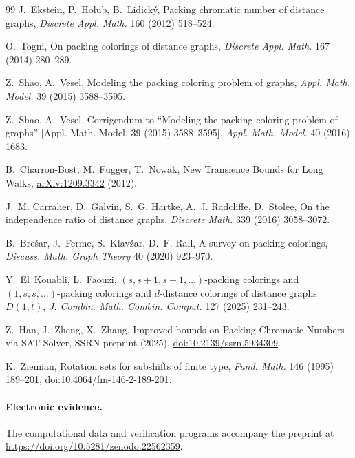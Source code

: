 \documentclass[11pt,reqno]{amsart}
\theoremstyle{plain}
\theoremstyle{plain}
\theoremstyle{plain}
\begin{document}
\begin{thebibliography}{99}
J.~Ekstein, P.~Holub, B.~Lidick\'y,
\newblock Packing chromatic number of distance graphs,
\newblock \emph{Discrete Appl. Math.} 160 (2012) 518--524.

O.~Togni,
\newblock On packing colorings of distance graphs,
\newblock \emph{Discrete Appl. Math.} 167 (2014) 280--289.

Z.~Shao, A.~Vesel,
\newblock Modeling the packing coloring problem of graphs,
\newblock \emph{Appl. Math. Model.} 39 (2015) 3588--3595.

Z.~Shao, A.~Vesel,
\newblock Corrigendum to ``Modeling the packing coloring problem of graphs''
  [Appl. Math. Model. 39 (2015) 3588--3595],
\newblock \emph{Appl. Math. Model.} 40 (2016) 1683.

B.~Charron-Bost, M.~F\"ugger, T.~Nowak,
\newblock New Transience Bounds for Long Walks,
\newblock \href{https://arxiv.org/abs/1209.3342}{arXiv:1209.3342} (2012).

J.~M. Carraher, D.~Galvin, S.~G. Hartke, A.~J. Radcliffe, D.~Stolee,
\newblock On the independence ratio of distance graphs,
\newblock \emph{Discrete Math.} 339 (2016) 3058--3072.

B.~Bre\v{s}ar, J.~Ferme, S.~Klav\v{z}ar, D.~F. Rall,
\newblock A survey on packing colorings,
\newblock \emph{Discuss. Math. Graph Theory} 40 (2020) 923--970.

Y.~El~Kouabli, L.~Faouzi,
\newblock $(s,s+1,s+1,\dots)$-packing colorings and $(1,s,s,\dots)$-packing
  colorings and $d$-distance colorings of distance graphs $D(1,t)$,
\newblock \emph{J. Combin. Math. Combin. Comput.} 127 (2025) 231--243.

Z.~Han, J.~Zheng, X.~Zhang,
\newblock Improved bounds on Packing Chromatic Numbers via SAT Solver,
\newblock SSRN preprint (2025),
\href{https://doi.org/10.2139/ssrn.5934309}{doi:10.2139/ssrn.5934309}.

K.~Ziemian,
\newblock Rotation sets for subshifts of finite type,
\newblock \emph{Fund. Math.} 146 (1995) 189--201,
\href{https://doi.org/10.4064/fm-146-2-189-201}{doi:10.4064/fm-146-2-189-201}.

\end{thebibliography}


\paragraph{Electronic evidence.}
The computational data and verification programs accompany the preprint at
\url{https://doi.org/10.5281/zenodo.22562359}.
\end{document}
